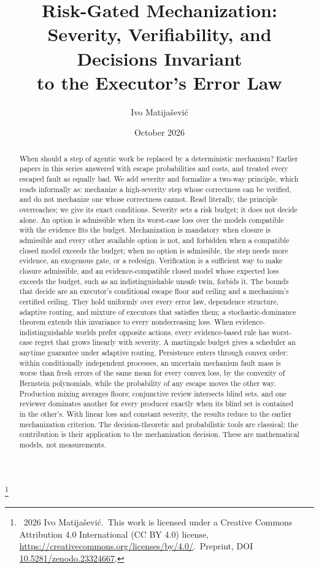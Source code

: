 \documentclass[11pt]{article}
\title{Risk-Gated Mechanization:\\Severity, Verifiability, and Decisions Invariant\\to the Executor's Error Law}
\author{Ivo Matija\v{s}evi\'c}
\date{October 2026}
\theoremstyle{definition}
\theoremstyle{remark}
\newcommand\blfootnote[1]{\begingroup\renewcommand\thefootnote{}\footnote{#1}\addtocounter{footnote}{-1}\endgroup}
\begin{document}
\maketitle
\blfootnote{\textcopyright~2026 Ivo Matija\v{s}evi\'c.\ This work is licensed under a Creative Commons
Attribution 4.0 International (CC BY 4.0) license, \url{https://creativecommons.org/licenses/by/4.0/}.\ Preprint, DOI \href{https://doi.org/10.5281/zenodo.23324667}{10.5281/zenodo.23324667}.}
\begin{abstract}
When should a step of agentic work be replaced by a deterministic mechanism? Earlier papers in
this series answered with escape probabilities and costs, and treated every escaped fault as
equally bad. We add severity and formalize a two-way principle, which reads informally as:
mechanize a high-severity step whose correctness can be verified, and do not mechanize one whose
correctness cannot. Read literally, the principle overreaches; we give its exact conditions.
Severity sets a risk budget; it does not decide alone. An option is admissible when its
worst-case loss over the models compatible with the evidence fits the budget. Mechanization is
mandatory when closure is admissible and every other available option is not, and forbidden when
a compatible closed model exceeds the budget; when no option is admissible, the step needs more
evidence, an exogenous gate, or a redesign. Verification is a sufficient way to make closure
admissible, and an evidence-compatible closed model whose expected loss exceeds the budget, such as an
indistinguishable unsafe twin, forbids it. The bounds that decide are an executor's conditional escape floor and ceiling and
a mechanism's certified ceiling. They hold uniformly over every error law, dependence
structure, adaptive routing, and mixture of executors that satisfies them; a stochastic-dominance
theorem extends this invariance to every nondecreasing loss. When evidence-indistinguishable worlds
prefer opposite actions, every evidence-based rule has worst-case regret that grows linearly with
severity. A martingale budget gives a scheduler an
anytime guarantee under adaptive routing. Persistence enters through convex order: within
conditionally independent processes, an uncertain mechanism fault mass is worse than fresh
errors of the same mean for every convex loss, by the convexity of Bernstein polynomials, while
the probability of any escape moves the other way. Production mixing averages floors;
conjunctive review intersects blind sets, and one reviewer dominates another for every producer
exactly when its blind set is contained in the other's. With linear loss and constant severity,
the results reduce to the earlier mechanization criterion. The decision-theoretic and probabilistic
tools are classical; the contribution is their application to the mechanization decision. These are
mathematical models, not measurements.
\end{abstract}
\end{document}
